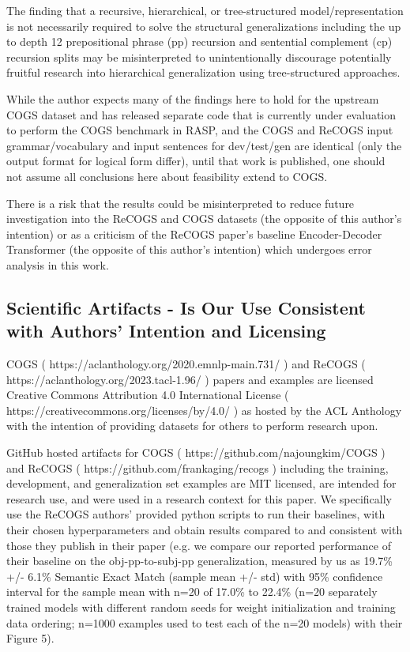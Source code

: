 \documentclass[11pt]{article}
\begin{document}
The finding that a recursive, hierarchical, or tree-structured model/representation is not necessarily required to solve the structural generalizations including the up to depth 12 prepositional phrase (pp) recursion and sentential complement (cp) recursion splits may be misinterpreted to unintentionally discourage potentially fruitful research into hierarchical generalization using tree-structured approaches.

While the author expects many of the findings here to hold for the upstream COGS dataset and has released separate code that is currently under evaluation to perform the COGS benchmark in RASP, and the COGS and ReCOGS input grammar/vocabulary and input sentences for dev/test/gen are identical (only the output format for logical form differ), until that work is published, one should not assume all conclusions here about feasibility extend to COGS.

There is a risk that the results could be misinterpreted to reduce future investigation into the ReCOGS and COGS datasets (the opposite of this author’s intention) or as a criticism of the ReCOGS paper's baseline Encoder-Decoder Transformer (the opposite of this author's intention) which undergoes error analysis in this work.

\subsection{Scientific Artifacts - Is Our Use Consistent with Authors' Intention and Licensing}
\label{scientific_artifacts_use}

COGS \cite{KimLinzen2020} ( https://aclanthology.org/2020.emnlp-main.731/ ) and ReCOGS \cite{Wu2023} ( https://aclanthology.org/2023.tacl-1.96/ ) papers and examples are licensed Creative Commons Attribution 4.0 International License ( https://creativecommons.org/licenses/by/4.0/ ) as hosted by the ACL Anthology with the intention of providing datasets for others to perform research upon. 

GitHub hosted artifacts for COGS ( https://github.com/najoungkim/COGS  ) and ReCOGS ( https://github.com/frankaging/recogs ) including the training, development, and generalization set examples are MIT licensed, are intended for research use, and were used in a research context for this paper. We specifically use the ReCOGS authors' provided python scripts to run their baselines, with their chosen hyperparameters and obtain results compared to and consistent with those they publish in their paper (e.g. we compare our reported performance of their baseline on the obj-pp-to-subj-pp generalization, measured by us as 19.7\% +/- 6.1\% Semantic Exact Match (sample mean +/- std) with 95\% confidence interval for the sample mean with n=20 of 17.0\% to 22.4\% (n=20 separately trained models with different random seeds for weight initialization and training data ordering; n=1000 examples used to test each of the n=20 models) with their Figure 5).
\end{document}
